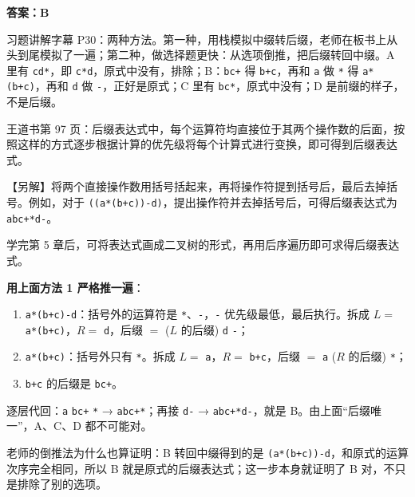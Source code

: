 \documentclass[10.5pt,a4paper,oneside]{article}
\newcommand{\hlred}[1]{\textcolor{wdred}{\bfseries #1}}
\providecommand{\tightlist}{\setlength{\itemsep}{2pt}\setlength{\parskip}{0pt}}
\begin{document}
\hlred{\textbf{答案：B}}

\begin{videobox}

习题讲解字幕
P30：两种方法。第一种，用栈模拟中缀转后缀，老师在板书上从头到尾模拟了一遍；第二种，做选择题更快：从选项倒推，把后缀转回中缀。A
里有 \texttt{cd*}，即 \texttt{c*d}，原式中没有，排除；B：\texttt{bc+} 得
\texttt{b+c}，再和 \texttt{a} 做 \texttt{*} 得 \texttt{a*(b+c)}，再和
\texttt{d} 做 \texttt{-}，正好是原式；C 里有 \texttt{bc*}，原式中没有；D
是前缀的样子，不是后缀。

\end{videobox}

\begin{jiexibox}

王道书第 97
页：后缀表达式中，每个运算符均直接位于其两个操作数的后面，按照这样的方式逐步根据计算的优先级将每个计算式进行变换，即可得到后缀表达式。

【另解】将两个直接操作数用括号括起来，再将操作符提到括号后，最后去掉括号。例如，对于
\texttt{((a*(b+c))-d)}，提出操作符并去掉括号后，可得后缀表达式为
\texttt{abc+*d-}。

学完第 5
章后，可将表达式画成二叉树的形式，再用后序遍历即可求得后缀表达式。

\end{jiexibox}

\begin{addbox}

\textbf{用上面方法 1 严格推一遍}：

\begin{enumerate}
\def\labelenumi{\arabic{enumi}.}
\tightlist
\item
  \texttt{a*(b+c)-d}：括号外的运算符是
  \texttt{*}、\texttt{-}，\texttt{-} 优先级最低，最后执行。拆成 \(L=\)
  \texttt{a*(b+c)}，\(R=\) \texttt{d}，后缀 \(=\) (\(L\) 的后缀)
  \texttt{d} \texttt{-}；
\item
  \texttt{a*(b+c)}：括号外只有 \texttt{*}。拆成 \(L=\)
  \texttt{a}，\(R=\) \texttt{b+c}，后缀 \(=\) \texttt{a} (\(R\) 的后缀)
  \texttt{*}；
\item
  \texttt{b+c} 的后缀是 \texttt{bc+}。
\end{enumerate}

逐层代回：\texttt{a} \texttt{bc+} \texttt{*} → \texttt{abc+*}；再接
\texttt{d-} → \texttt{abc+*d-}，就是 B。由上面“后缀唯一”，A、C、D
都不可能对。

老师的倒推法为什么也算证明：B 转回中缀得到的是
\texttt{(a*(b+c))-d}，和原式的运算次序完全相同，所以 B
就是原式的后缀表达式；这一步本身就证明了 B 对，不只是排除了别的选项。

\end{addbox}
\end{document}
